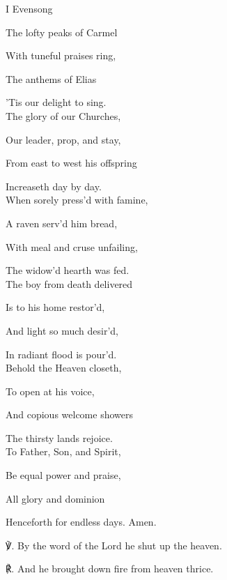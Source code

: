 \begin{paracol}{2}[]
\sloppy
\begin{inhead}
	I Evensong
\end{inhead}
\begin{hangparas}{1.25em}{1}
The lofty peaks of Carmel

With tuneful praises ring,

The anthems of Elias

'Tis our delight to sing.\\

The glory of our Churches,

Our leader, prop, and stay,

From east to west his offspring

Increaseth day by day.\\

When sorely press'd with famine,

A raven serv'd him bread,

With meal and cruse unfailing,

The widow'd hearth was fed.\\

The boy from death delivered

Is to his home restor'd,

And light so much desir'd,

In radiant flood is pour'd.\\

Behold the Heaven closeth,

To open at his voice,

And copious welcome showers

The thirsty lands rejoice.\\

To Father, Son, and Spirit,

Be equal power and praise,

All glory and dominion

Henceforth for endless days. Amen.\\
\end{hangparas}

    ℣. By the word of the Lord he shut up the heaven.

	℟. And he brought down fire from heaven thrice.

\par\noindent


\end{paracol}
